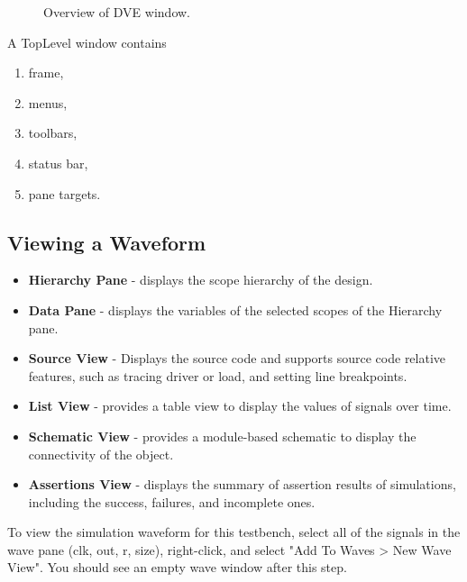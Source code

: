 \documentclass[a4paper,12pt,twoside]{article}
\begin{document}
\begin{enumerate}
\begin{figure}[H]
        \caption{Overview of DVE window.}
    \end{figure}
    A TopLevel window contains
    \begin{enumerate}
        \item frame,
        \item menus, 
        \item toolbars,
        \item status bar, 
        \item pane targets.
    \end{enumerate}
\end{enumerate}
\subsection{Viewing a Waveform}
\begin{itemize}
    \item \textbf{Hierarchy Pane} - displays the scope hierarchy of the design.
    \item \textbf{Data Pane} - displays the variables of the selected scopes of the Hierarchy pane.
    \item \textbf{Source View} - Displays the source code and supports source code relative features, such as tracing driver or load, and setting line breakpoints.
    \item \textbf{List View} - provides a table view to display the values of signals over time.
    \item \textbf{Schematic View} - provides a module-based schematic to display the connectivity of the object.
    \item \textbf{Assertions View} - displays the summary of assertion results of simulations, including the success, failures, and incomplete ones.
\end{itemize}
To view the simulation waveform for this testbench, select all of the signals in the wave pane (clk, out, r, size), right-click, and select "Add To Waves > New Wave View". You should see an empty wave window after this step.
\end{document}
